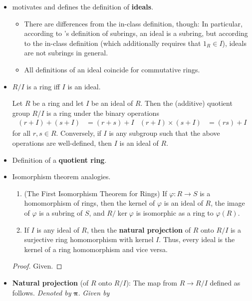 \documentclass[../notes.tex]{subfiles}
\begin{document}
\begin{itemize}
    \item \textcite{bib:DummitFoote} motivates and defines the definition of \textbf{ideals}.
    \begin{itemize}
        \item There are differences from the in-class definition, though: In particular, according to \textcite{bib:DummitFoote}'s definition of subrings, an ideal is a subring, but according to the in-class definition (which additionally requires that $1_R\in I$), ideals are not subrings in general.
        \item All definitions of an ideal coincide for commutative rings.
    \end{itemize}
    \item $R/I$ is a ring iff $I$ is an ideal.
    \begin{proposition}\label{prp:7.6}
        Let $R$ be a ring and let $I$ be an ideal of $R$. Then the (additive) quotient group $R/I$ is a ring under the binary operations
        \begin{align*}
            (r+I)+(s+I) &= (r+s)+I&
            (r+I)\times(s+I) &= (rs)+I
        \end{align*}
        for all $r,s\in R$. Conversely, if $I$ is any subgroup such that the above operations are well-defined, then $I$ is an ideal of $R$.
    \end{proposition}
    \item Definition of a \textbf{quotient ring}.
    \item Isomorphism theorem analogies.
    \begin{theorem}\label{trm:7.7}\leavevmode
        \begin{enumerate}
            \item (The First Isomorphism Theorem for Rings) If $\varphi:R\to S$ is a homomorphism of rings, then the kernel of $\varphi$ is an ideal of $R$, the image of $\varphi$ is a subring of $S$, and $R/\ker\varphi$ is isomorphic as a ring to $\varphi(R)$.
            \item If $I$ is any ideal of $R$, then the \textbf{natural projection} of $R$ onto $R/I$ is a surjective ring homomorphism with kernel $I$. Thus, every ideal is the kernel of a ring homomorphism and vice versa.
        \end{enumerate}
        \begin{proof}
            Given.
        \end{proof}
    \end{theorem}
    \item \textbf{Natural projection} (of $R$ onto $R/I$): The map from $R\to R/I$ defined as follows. \emph{Denoted by} $\bm{\pi}$. \emph{Given by}

\end{itemize}
\end{document}
